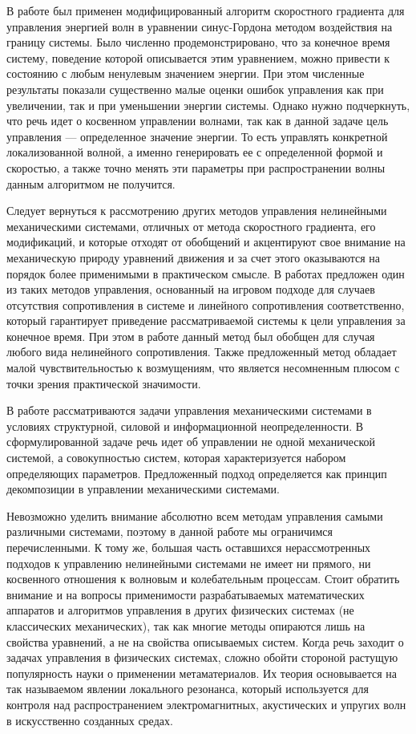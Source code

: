 В работе \cite{dolgopolik2016boundary} был применен модифицированный алгоритм скоростного градиента для управления энергией волн в уравнении синус-Гордона методом воздействия на границу системы. Было численно продемонстрировано, что за конечное время систему, поведение которой описывается этим уравнением, можно привести к состоянию с любым ненулевым значением энергии. При этом численные результаты показали существенно малые оценки ошибок управления как при увеличении, так и при уменьшении энергии системы. Однако нужно подчеркнуть, что речь идет о косвенном управлении волнами, так как в данной задаче цель управления --- определенное значение энергии. То есть управлять конкретной локализованной волной, а именно генерировать ее с определенной формой и скоростью, а также точно менять эти параметры при распространении волны данным алгоритмом не получится.

Следует вернуться к рассмотрению других методов управления нелинейными механическими системами, отличных от метода скоростного градиента, его модификаций, и которые отходят от обобщений и акцентируют свое внимание на механическую природу уравнений движения и за счет этого оказываются на порядок более применимыми в практическом смысле.
В работах \cite{intro_chern13, intro_chern14} предложен один из таких методов управления, основанный на игровом подходе для случаев отсутствия сопротивления в системе и линейного сопротивления соответственно, который гарантирует приведение рассматриваемой системы к цели управления за конечное время. При этом в работе \cite{intro_chern15} данный метод был обобщен для случая любого вида нелинейного сопротивления. Также предложенный метод обладает малой чувствительностью к возмущениям, что является несомненным плюсом с точки зрения практической значимости.

В работе \cite{intro_pyatn} рассматриваются задачи управления механическими системами в условиях структурной, силовой и информационной неопределенности. В сформулированной задаче речь идет об управлении не одной механической системой, а совокупностью систем, которая характеризуется набором определяющих параметров. Предложенный подход определяется как принцип декомпозиции в управлении механическими системами.

Невозможно уделить внимание абсолютно всем методам управления самыми различными системами, поэтому в данной работе мы ограничимся перечисленными. К тому же, большая часть оставшихся нерассмотренных подходов к управлению нелинейными системами не имеет ни прямого, ни косвенного отношения к волновым и колебательным процессам.
Стоит обратить внимание и на вопросы применимости разрабатываемых математических аппаратов и алгоритмов управления в других физических системах (не классических механических), так как многие методы опираются лишь на свойства уравнений, а не на свойства описываемых систем. Когда речь заходит о задачах управления в физических системах, сложно обойти стороной растущую популярность науки о применении метаматериалов. Их теория основывается на так называемом явлении локального резонанса, который используется для контроля над распространением электромагнитных, акустических и упругих волн в искусственно созданных средах. 

